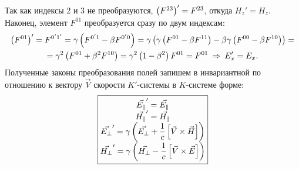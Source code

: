     Так как индексы $2$ и $3$ не преобразуются, $\left({F^{23}}\right)' = F^{23}$, откуда $H_z' = H_z$. Наконец, элемент $F^{01}$ преобразуется
    сразу по двум индексам:
    \begin{gather*}
        \left({F^{01}}\right)' = F^{0'1'} = \gamma\left({F^{0'1} -\beta F^{0'0}}\right) =
        \gamma\left({\gamma\left({F^{01} - \beta F^{11}}\right) - \beta\gamma\left({F^{00} - \beta F^{10}}\right)}\right) = \\
        = \gamma^2\left({F^{01} + \beta^2F^{10}}\right) = \gamma^2\left({1 - \beta^2}\right)F^{01} = F^{01} \: \Rightarrow \: E_x' = E_x.
    \end{gather*}
    Полученные законы преобразования полей запишем в инвариантной по отношению к вектору $\vec{V}$ скорости $K'$-системы в $K$-системе форме:
    \[
        \boxed{
            \begin{matrix}
                \displaystyle \vec{E_{\parallel}}' = \vec{E_{\parallel}} \\
                \displaystyle \vec{H_{\parallel}}' = \vec{H_{\parallel}} \\
                \displaystyle \vec{E_{\perp}}' = \gamma\left({\vec{E_{\perp}} + \frac 1c \left[{\vec{V}\times\vec{H}}\right]}\right) \\
                \displaystyle \vec{H_{\perp}}' = \gamma\left({\vec{H_{\perp}} - \frac 1c \left[{\vec{V}\times\vec{E}}\right]}\right)
            \end{matrix}
        }
    \]

